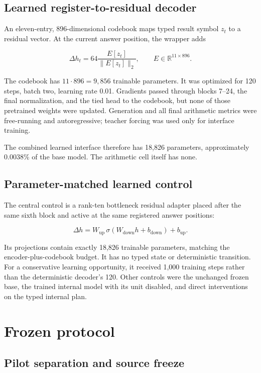 \documentclass[11pt]{article}
\begin{document}
\subsection{Learned register-to-residual decoder}

An eleven-entry, 896-dimensional codebook maps typed result symbol \(z_t\) to
a residual vector. At the current answer position, the wrapper adds

\[
\Delta h_t = 64\frac{E[z_t]}{\lVert E[z_t]\rVert_2},
\qquad E\in\mathbb{R}^{11\times896}.
\]

The codebook has \(11\cdot896=9{,}856\) trainable parameters. It was optimized
for 120 steps, batch two, learning rate 0.01. Gradients passed through blocks
7--24, the final normalization, and the tied head to the codebook, but none of
those pretrained weights were updated. Generation and all final arithmetic
metrics were free-running and autoregressive; teacher forcing was used only
for interface training.

The combined learned interface therefore has 18,826 parameters, approximately
0.0038\% of the base model. The arithmetic cell itself has none.

\subsection{Parameter-matched learned control}

The central control is a rank-ten bottleneck residual adapter placed after
the same sixth block and active at the same registered answer positions:

\[
\Delta h = W_{\mathrm{up}}\,\sigma(W_{\mathrm{down}}h+b_{\mathrm{down}})
+b_{\mathrm{up}}.
\]

Its projections contain exactly 18,826 trainable parameters, matching the
encoder-plus-codebook budget. It has no typed state or deterministic
transition. For a conservative learning opportunity, it received 1,000
training steps rather than the deterministic decoder's 120. Other controls
were the unchanged frozen base, the trained internal model with its unit
disabled, and direct interventions on the typed internal plan.

\section{Frozen protocol}

\subsection{Pilot separation and source freeze}
\end{document}
